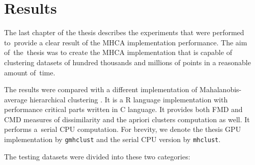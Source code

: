 \chapter{Results}

The last chapter of the thesis describes the experiments that were performed to~provide a clear result of the MHCA implementation performance. The aim of~the~thesis was to create the MHCA implementation that is capable of clustering datasets of hundred thousands and millions of points in a reasonable amount of~time.

The results were compared with a different implementation of Mahalanobis-average hierarchical clustering \cite{fivser2012detection}. It is a R language implementation with performance critical parts written in C language. It provides both FMD and CMD measures of dissimilarity and the apriori clusters computation as well. It performs a~serial CPU computation. For brevity, we denote the thesis GPU implementation by \texttt{gmhclust} and the serial CPU version by \texttt{mhclust}.

The testing datasets were divided into these two categories:

